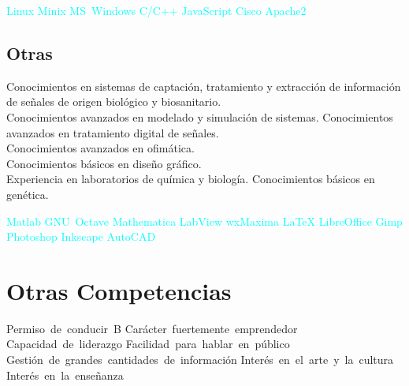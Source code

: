 \documentclass[11pt,a4paper,sans,spanish]{moderncv}
\begin{document}
\begin{center}
\textcolor{cyan}{
Linux \quad{} Minix \quad{} MS~Windows \quad{} C/C++ \quad{} JavaScript \quad{} Cisco \quad{} Apache2 
}
\end{center}

\subsection{Otras}
Conocimientos en sistemas de captación, tratamiento y extracción de información de señales de origen biológico y biosanitario.
\protect\\[0.3em]
Conocimientos avanzados en modelado y simulación de sistemas.
Conocimientos avanzados en tratamiento digital de señales.
\protect\\[0.3em]
Conocimientos avanzados en ofimática.
\protect\\[0.3em]
Conocimientos básicos en diseño gráfico.
\protect\\[0.3em]
Experiencia en laboratorios de química y biología.
Conocimientos básicos en genética.

\begin{center}
\textcolor{cyan}{
Matlab \quad{} GNU~Octave \quad{} Mathematica \quad{} LabView \quad{} wxMaxima \quad{} LaTeX \quad{} LibreOffice \quad{} Gimp \quad{} Photoshop \quad{} Inkscape \quad{} AutoCAD
}
\end{center}


\section{Otras Competencias}
\begin{center}
Permiso~de~conducir~B \quad{} Carácter~fuertemente~emprendedor \quad{} Capacidad~de~liderazgo \quad{} Facilidad~para~hablar~en~público \quad{} Gestión~de~grandes~cantidades~de~información \quad{} Interés~en~el~arte~y~la~cultura \quad{} Interés~en~la~enseñanza
\end{center}
\end{document}
